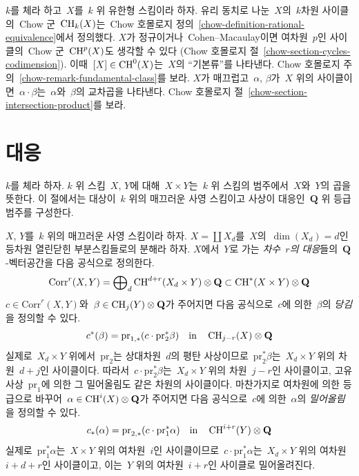 \medskip\noindent
$k$를 체라 하고\  $X$를\  $k$ 위 유한형 스킴이라 하자. 유리 동치로 나눈\ 
$X$의\  $k$차원 사이클의\  Chow 군\  $\mathop{\mathrm{CH}}\nolimits_k(X)$는\  Chow 호몰로지 정의\ 
\ref{chow-definition-rational-equivalence}에서 정의했다.
$X$가 정규이거나\  Cohen--Macaulay이면 여차원\  $p$인 사이클의\  Chow 군\ 
$\mathop{\mathrm{CH}}\nolimits^p(X)$도 생각할 수 있다
(Chow 호몰로지 절\  \ref{chow-section-cycles-codimension}).
이때\  $[X] \in \mathop{\mathrm{CH}}\nolimits^0(X)$는\  $X$의 “기본류”를 나타낸다.
Chow 호몰로지 주의\  \ref{chow-remark-fundamental-class}를 보라.
$X$가 매끄럽고\  $\alpha$, $\beta$가\  $X$ 위의 사이클이면\ 
$\alpha \cdot \beta$는\  $\alpha$와\  $\beta$의 교차곱을 나타낸다.
Chow 호몰로지 절\  \ref{chow-section-intersection-product}를 보라.











\section{대응}
\label{section-correspondences}

\noindent
$k$를 체라 하자. $k$ 위 스킴\  $X$, $Y$에 대해\  $X \times Y$는\ 
$k$ 위 스킴의 범주에서\  $X$와\  $Y$의 곱을 뜻한다. 이 절에서는 대상이\ 
$k$ 위의 매끄러운 사영 스킴이고 사상이 대응인\  $\mathbf{Q}$ 위 등급
범주를 구성한다.

\medskip\noindent
$X$, $Y$를\  $k$ 위의 매끄러운 사영 스킴이라 하자.
$X = \coprod X_d$를\  $X$의\  $\dim(X_d) = d$인 등차원 열린닫힌 부분스킴들로의
분해라 하자. $X$에서\  $Y$로 가는 {\it 차수\  $r$의 대응}들의\ 
$\mathbf{Q}$-벡터공간을 다음 공식으로 정의한다.
$$
\text{Corr}^r(X, Y) =
\bigoplus\nolimits_d \mathop{\mathrm{CH}}\nolimits^{d + r}(X_d \times Y) \otimes \mathbf{Q}
\subset
\mathop{\mathrm{CH}}\nolimits^*(X \times Y) \otimes \mathbf{Q}
$$
$c \in \text{Corr}^r(X, Y)$와\ 
$\beta \in \mathop{\mathrm{CH}}\nolimits_j(Y) \otimes \mathbf{Q}$가 주어지면 다음 공식으로\ 
$c$에 의한\  $\beta$의 {\it 당김}을 정의할 수 있다.
$$
c^*(\beta) = \text{pr}_{1, *}(c \cdot \text{pr}_2^*\beta)
\quad\text{in}\quad
\mathop{\mathrm{CH}}\nolimits_{j - r}(X) \otimes \mathbf{Q}
$$
실제로\  $X_d \times Y$ 위에서\  $\text{pr}_2$는 상대차원\  $d$의
평탄 사상이므로\  $\text{pr}_2^*\beta$는\  $X_d \times Y$ 위의
차원\  $d + j$인 사이클이다. 따라서\ 
$c \cdot \text{pr}_2^*\beta$는\  $X_d \times Y$ 위의
차원\  $j - r$인 사이클이고, 고유 사상\  $\text{pr}_1$에 의한 그
밀어올림도 같은 차원의 사이클이다.
마찬가지로 여차원에 의한 등급으로 바꾸어\ 
$\alpha \in \mathop{\mathrm{CH}}\nolimits^i(X) \otimes \mathbf{Q}$가 주어지면 다음 공식으로\ 
$c$에 의한\  $\alpha$의 {\it 밀어올림}을 정의할 수 있다.
$$
c_*(\alpha) = \text{pr}_{2, *}(c \cdot \text{pr}_1^*\alpha)
\quad\text{in}\quad
\mathop{\mathrm{CH}}\nolimits^{i + r}(Y) \otimes \mathbf{Q}
$$
실제로\  $\text{pr}_1^*\alpha$는\  $X \times Y$ 위의 여차원\  $i$인
사이클이므로\  $c \cdot \text{pr}_1^*\alpha$는\ 
$X_d \times Y$ 위의 여차원\  $i + d + r$인 사이클이고, 이는\  $Y$ 위의
여차원\  $i + r$인 사이클로 밀어올려진다.

